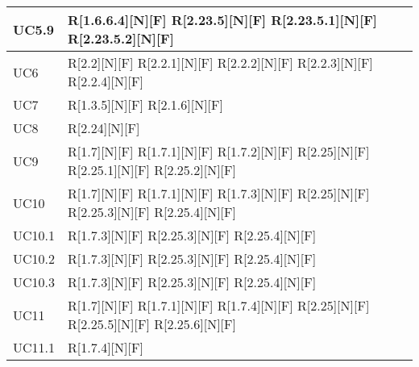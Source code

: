 \begin{longtable}{X | X}
UC5.9 & R[1.6.6.4][N][F] \newline
R[2.23.5][N][F] \newline
R[2.23.5.1][N][F] \newline
R[2.23.5.2][N][F]  \\
\hline
UC6 & R[2.2][N][F] \newline
R[2.2.1][N][F] \newline
R[2.2.2][N][F] \newline
R[2.2.3][N][F] \newline
R[2.2.4][N][F]  \\
\hline
UC7 & R[1.3.5][N][F] \newline
R[2.1.6][N][F]  \\
\hline
UC8 & R[2.24][N][F]  \\
\hline
UC9 & R[1.7][N][F] \newline
R[1.7.1][N][F] \newline
R[1.7.2][N][F] \newline
R[2.25][N][F] \newline
R[2.25.1][N][F] \newline
R[2.25.2][N][F]  \\
\hline
UC10 & R[1.7][N][F] \newline
R[1.7.1][N][F] \newline
R[1.7.3][N][F] \newline
R[2.25][N][F] \newline
R[2.25.3][N][F] \newline
R[2.25.4][N][F]  \\
\hline
UC10.1 & R[1.7.3][N][F] \newline
R[2.25.3][N][F] \newline
R[2.25.4][N][F]  \\
\hline
UC10.2 & R[1.7.3][N][F] \newline
R[2.25.3][N][F] \newline
R[2.25.4][N][F]  \\
\hline
UC10.3 & R[1.7.3][N][F] \newline
R[2.25.3][N][F] \newline
R[2.25.4][N][F]  \\
\hline
UC11 & R[1.7][N][F] \newline
R[1.7.1][N][F] \newline
R[1.7.4][N][F] \newline
R[2.25][N][F] \newline
R[2.25.5][N][F] \newline
R[2.25.6][N][F]  \\
\hline
UC11.1 & R[1.7.4][N][F] \newline

\end{longtable}
